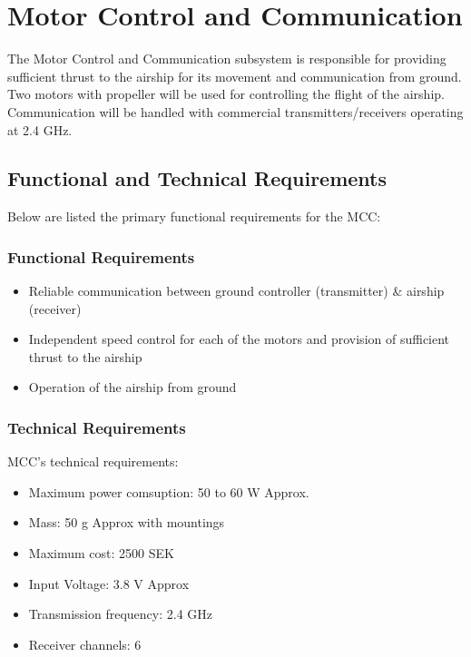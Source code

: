 \chapter{Motor Control and Communication}
\label{chap:mcc}

The Motor Control and Communication subsystem is responsible for providing sufficient thrust to the airship for its movement and communication from ground. Two motors with propeller will be used for controlling the flight of the airship. Communication will be handled with commercial transmitters/receivers operating at 2.4 GHz. 

\section{Functional and Technical Requirements}

Below are listed the primary functional requirements for the MCC:

\subsection{Functional Requirements}

\begin{itemize}
\item Reliable communication between ground controller (transmitter) \& airship (receiver)
\item Independent speed control for each of the motors and provision of sufficient thrust to the airship
\item Operation of the airship from ground 
\end{itemize}


\subsection{Technical Requirements}

MCC's technical requirements:

\begin{itemize}
\item Maximum power comsuption: 50 to 60 W Approx. 
\item Mass: 50 g Approx with mountings
\item Maximum cost: 2500 SEK
\item Input Voltage: 3.8 V Approx
\item Transmission frequency: 2.4 GHz
\item Receiver channels: 6
\end{itemize}

